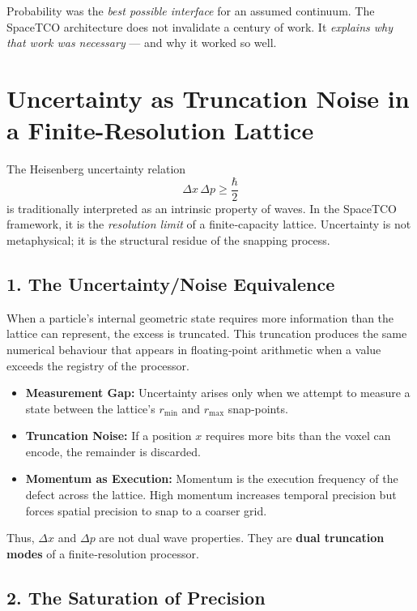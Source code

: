 \documentclass[reprint,amsmath,amssymb,aps,prl,floatfix]{revtex4-2}
\begin{document}
\begin{itemize}
Probability was the \textit{best possible interface} for an assumed continuum.  
The SpaceTCO architecture does not invalidate a century of work.  
It \textit{explains why that work was necessary} — and why it worked so well.
\medskip

\section{Uncertainty as Truncation Noise in a Finite-Resolution Lattice}

The Heisenberg uncertainty relation  
\[
\Delta x\,\Delta p \ge \frac{\hbar}{2}
\]  
is traditionally interpreted as an intrinsic property of waves. In the SpaceTCO framework, it is the \textit{resolution limit} of a finite‑capacity lattice. Uncertainty is not metaphysical; it is the structural residue of the snapping process.

\subsection{1. The Uncertainty/Noise Equivalence}

When a particle’s internal geometric state requires more information than the lattice can represent, the excess is truncated. This truncation produces the same numerical behaviour that appears in floating‑point arithmetic when a value exceeds the registry of the processor.
\begin{itemize}
\item \textbf{Measurement Gap:} Uncertainty arises only when we attempt to measure a state between the lattice’s \(r_{\min}\) and \(r_{\max}\) snap‑points.  
\item \textbf{Truncation Noise:} If a position \(x\) requires more bits than the voxel can encode, the remainder is discarded.  
\item \textbf{Momentum as Execution:} Momentum is the execution frequency of the defect across the lattice. High momentum increases temporal precision but forces spatial precision to snap to a coarser grid.
\end{itemize}
\medskip
Thus, \(\Delta x\) and \(\Delta p\) are not dual wave properties.  
They are \textbf{dual truncation modes} of a finite‑resolution processor.

\subsection{2. The Saturation of Precision}


\end{itemize}
\end{document}

